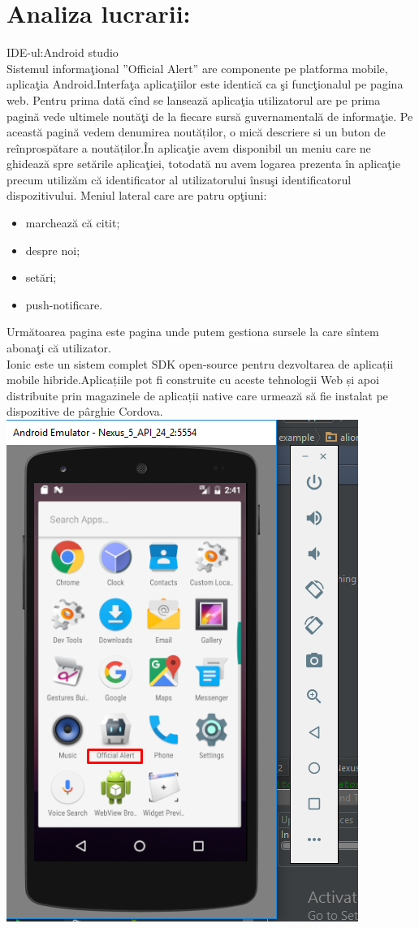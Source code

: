 \documentclass[12pt]{article}
\begin{document}
\section{Analiza lucrarii:}
IDE-ul:Android studio\\
Sistemul informaţional ”Official Alert” are componente pe platforma mobile, aplicaţia Android.Interfaţa aplicaţiilor este identică ca şi funcţionalul pe pagina web. Pentru prima dată cînd se lansează aplicaţia utilizatorul are pe prima pagină vede ultimele noutăţi de la fiecare sursă guvernamentală de informaţie. Pe această pagină vedem denumirea noutăților, o mică descriere si un buton de reînprospătare a noutăților.În aplicaţie avem disponibil un meniu care ne ghidează spre setările aplicaţiei, totodată nu avem logarea prezenta în aplicaţie precum utilizăm că identificator al utilizatorului însuşi identificatorul dispozitivului. Meniul lateral care are patru opţiuni:
\begin{itemize}
\item marchează că citit;
\item despre noi;
\item setări;
\item push-notificare.
\end{itemize}	
	Următoarea pagina este pagina unde putem gestiona sursele la care sîntem abonaţi că utilizator.\\
    Ionic este un sistem complet SDK open-source pentru dezvoltarea de aplicații mobile hibride.Aplicațiile pot fi construite cu aceste tehnologii Web și apoi distribuite prin magazinele de aplicații native care urmează să fie instalat pe dispozitive de pârghie Cordova.
\\
\includegraphics{1.png}\\
\end{document}
